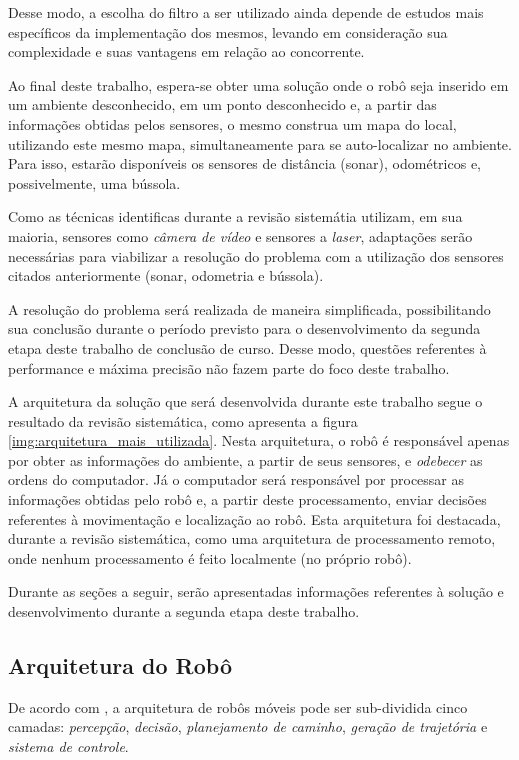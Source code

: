 	Desse modo, a escolha do filtro a ser utilizado ainda depende de estudos mais específicos da implementação dos mesmos, levando em consideração sua complexidade e suas vantagens em relação ao concorrente.

	Ao final deste trabalho, espera-se obter uma solução onde o robô seja inserido em um ambiente desconhecido, em um ponto desconhecido e, a partir das informações obtidas pelos sensores, o mesmo construa um mapa do local, utilizando este mesmo mapa, simultaneamente para se auto-localizar no ambiente. Para isso, estarão disponíveis os sensores de distância (sonar), odométricos e, possivelmente, uma bússola.

	Como as técnicas identificas durante a revisão sistemátia utilizam, em sua maioria, sensores como \textit{câmera de vídeo} e sensores a \textit{laser}, adaptações serão necessárias para viabilizar a resolução do problema com a utilização dos sensores citados anteriormente (sonar, odometria e bússola).

	A resolução do problema será realizada de maneira simplificada, possibilitando sua conclusão durante o período previsto para o desenvolvimento da segunda etapa deste trabalho de conclusão de curso. Desse modo, questões referentes à performance e máxima precisão não fazem parte do foco deste trabalho.

	A arquitetura da solução que será desenvolvida durante este trabalho segue o resultado da revisão sistemática, como apresenta a figura \ref{img:arquitetura_mais_utilizada}. Nesta arquitetura, o robô é responsável apenas por obter as informações do ambiente, a partir de seus sensores, e \textit{odebecer} as ordens do computador. Já o computador será responsável por processar as informações obtidas pelo robô e, a partir deste processamento, enviar decisões referentes à movimentação e localização ao robô. Esta arquitetura foi destacada, durante a revisão sistemática, como uma arquitetura de processamento remoto, onde nenhum processamento é feito localmente (no próprio robô).

	Durante as seções a seguir, serão apresentadas informações referentes à solução e desenvolvimento durante a segunda etapa deste trabalho.

	\subsection{Arquitetura do Robô} %
	\label{sub:arquitetura_do_robô}
		
		De acordo com \cite{vieira}, a arquitetura de robôs móveis pode ser sub-dividida cinco camadas: \textit{percepção}, \textit{decisão}, \textit{planejamento de caminho}, \textit{geração de trajetória} e \textit{sistema de controle}.

